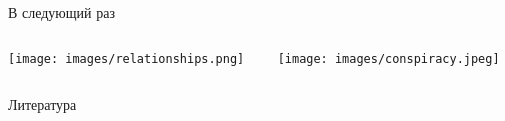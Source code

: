 \documentclass[11pt,aspectratio=169,handout]{beamer}
\begin{document}
\begin{frame}{В следующий раз}

\begin{columns}

\begin{column}{0.47\textwidth} 
\begin{center}
\texttt{[image: images/relationships.png]}
\end{center}
\end{column}

\begin{column}{0.47\textwidth}
\begin{center}
\texttt{[image: images/conspiracy.jpeg]}
\end{center}
\end{column}

\end{columns}

\end{frame}

\begin{frame}[allowframebreaks]{Литература}




\end{frame}
\end{document}

